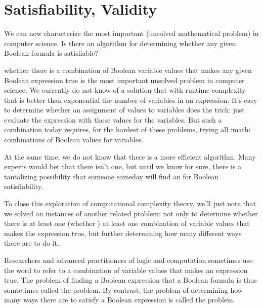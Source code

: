 \documentclass[letterpaper,10pt,english]{sphinxmanual}
\begin{document}
\section{Satisfiability, Validity}
\label{\detokenize{08-propositional-logic:satisfiability-validity}}
We can now characterize the most important  (unsolved
mathematical problem) in computer science.  Is there an 
algorithm for determining whether any given Boolean formula is
satisfiable?

whether there is a combination of Boolean
variable values that makes any given Boolean expression true is the
most important unsolved problem in computer science. We currently do
not know of a solution that with runtime complexity that is better
than exponential the number of variables in an expression.  It’s easy
to determine whether an assignment of values to variables does the
trick: just evaluate the expression with those values for the
variables. But  such a combination today requires, for the
hardest of these problems, trying all :math: combinations of
Boolean values for  variables.

At the same time, we do not know that there is  a more efficient
algorithm. Many experts would bet that there isn’t one, but until we
know for sure, there is a tantalizing possibility that someone someday
will find an  for Boolean satisfiability.

To close this exploration of computational complexity theory, we’ll
just note that we solved an instances of another related problem: not
only to determine whether there is at least one (whether ) at least one combination of variable values that makes the
expression true, but further determining how many different ways there
are to do it.

Researchers and advanced practitioners of logic and computation
sometimes use the word  to refer to a combination of variable
values that makes an expression true. The problem of finding a Boolean
expression that  a Boolean formula is thus somtetimes
called the  problem. By contrast, the problem of
determining how many ways there are to satisfy a Boolean expression is
called the  problem.
\end{document}
